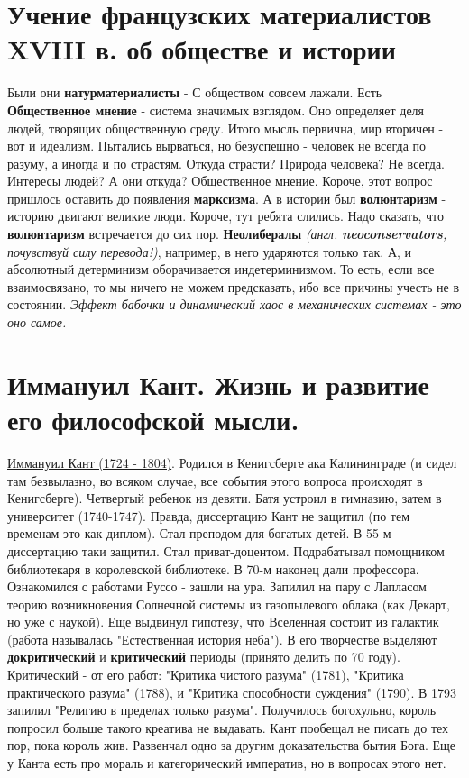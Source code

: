 \section{Учение французских материалистов XVIII в.  об обществе и истории}
Были они \textbf{натурматериалисты} - С обществом совсем лажали. Есть \textbf{Общественное мнение} - система значимых взглядом. Оно определяет деля людей, творящих общественную среду. Итого мысль первична, мир вторичен - вот и идеализм. Пытались вырваться, но безуспешно - человек не всегда по разуму, а иногда и по страстям. Откуда страсти? Природа человека? Не всегда. Интересы людей? А они откуда? Общественное мнение. Короче, этот вопрос пришлось оставить до появления \textbf{марксизма}. А в истории был \textbf{волюнтаризм} - историю двигают великие люди. Короче, тут ребята слились. Надо сказать, что \textbf{волюнтаризм} встречается до сих пор. \textbf{Неолибералы} \textit{(англ. \textbf{neoconservators}, почувствуй силу перевода!)}, например, в него ударяются только так. А, и абсолютный детерминизм оборачивается индетерминизмом. То есть, если все взаимосвязано, то мы ничего не можем предсказать, ибо все причины учесть не в состоянии. \textit{Эффект бабочки и динамический хаос в механических системах - это оно самое. }

\section{Иммануил Кант.  Жизнь и развитие его философской мысли.}
\underline{Иммануил Кант (1724 - 1804)}. Родился в Кенигсберге ака Калининграде (и сидел там безвылазно, во всяком случае, все события этого вопроса происходят в Кенигсберге). Четвертый ребенок из девяти. Батя устроил в гимназию, затем в университет (1740-1747). Правда, диссертацию Кант не защитил (по тем временам это как диплом). Стал преподом для богатых детей. В 55-м диссертацию таки защитил. Стал приват-доцентом. Подрабатывал помощником библиотекаря в королевской библиотеке. В 70-м наконец дали профессора. Ознакомился с работами Руссо - зашли на ура. Запилил на пару с Лапласом теорию возникновения Солнечной системы из газопылевого облака (как Декарт, но уже с наукой). Еще выдвинул гипотезу, что Вселенная состоит из галактик (работа называлась "Естественная история неба"). В его творчестве выделяют \textbf{докритический} и \textbf{критический} периоды (принято делить по 70 году). Критический - от его работ: "Критика чистого разума" (1781), "Критика практического разума" (1788), и "Критика способности суждения" (1790). В 1793 запилил "Религию в пределах только разума". Получилось богохульно, король попросил больше такого креатива не выдавать. Кант пообещал не писать до тех пор, пока король жив.   Развенчал одно за другим доказательства бытия Бога. Еще у Канта есть про мораль и категорический императив, но в вопросах этого нет. 

